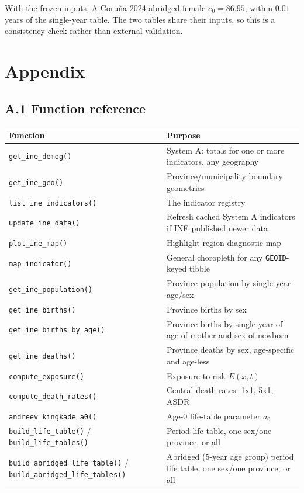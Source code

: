 \documentclass[11pt]{article}
\newcommand{\fn}[1]{\texttt{#1}}
\begin{document}
With the frozen inputs, A Coru\~{n}a 2024 abridged female $e_0 = 86.95$,
within $0.01$ years of the single-year table. The two tables share their
inputs, so this is a consistency check rather than external validation.

\newpage
\appendix
\section*{Appendix}

\subsection*{A.1 Function reference}

\begin{longtable}{@{}p{5.3cm}p{9.5cm}@{}}
\toprule
Function & Purpose \\
\midrule
\endhead
\fn{get\_ine\_demog()} & System A: totals for one or more indicators, any geography \\
\fn{get\_ine\_geo()} & Province/municipality boundary geometries \\
\fn{list\_ine\_indicators()} & The indicator registry \\
\fn{update\_ine\_data()} & Refresh cached System A indicators if INE published newer data \\
\fn{plot\_ine\_map()} & Highlight-region diagnostic map \\
\fn{map\_indicator()} & General choropleth for any \fn{GEOID}-keyed tibble \\
\fn{get\_ine\_population()} & Province population by single-year age/sex \\
\fn{get\_ine\_births()} & Province births by sex \\
\fn{get\_ine\_births\_by\_age()} & Province births by single year of age of mother and sex of newborn \\
\fn{get\_ine\_deaths()} & Province deaths by sex, age-specific and age-less \\
\fn{compute\_exposure()} & Exposure-to-risk $E(x,t)$ \\
\fn{compute\_death\_rates()} & Central death rates: 1x1, 5x1, ASDR \\
\fn{andreev\_kingkade\_a0()} & Age-0 life-table parameter $a_0$ \\
\fn{build\_life\_table()} / \fn{build\_life\_tables()} & Period life table, one sex/one province, or all \\
\fn{build\_abridged\_life\_table()} / \fn{build\_abridged\_life\_tables()} & Abridged (5-year age group) period life table, one sex/one province, or all \\

\end{longtable}
\end{document}
